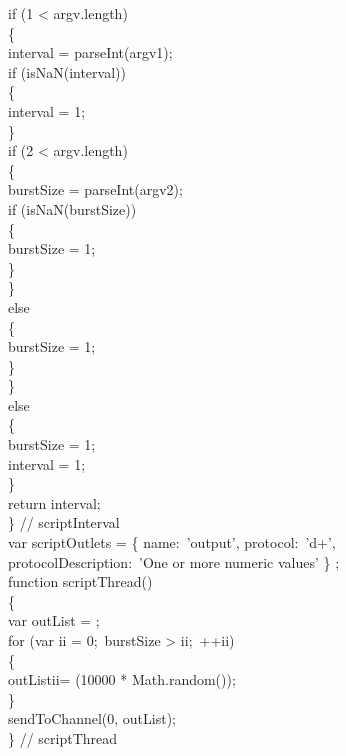\tS{}if (1 < argv.length)\\
\tS\{\\
\tS\tS{}interval = parseInt(argv\openSq{}1\closeSq);\\
\tS\tS{}if (isNaN(interval))\\
\tS\tS\{\\
\tS\tS\tS{}interval = 1;\\
\tS\tS\}\\
\tS\tS{}if (2 < argv.length)\\
\tS\tS\{\\
\tS\tS\tS{}burstSize = parseInt(argv\openSq{}2\closeSq);\\
\tS\tS\tS{}if (isNaN(burstSize))\\
\tS\tS\tS\{\\
\tS\tS\tS\tS{}burstSize = 1;\\
\tS\tS\tS\}\\
\tS\tS\}\\
\tS\tS{}else\\
\tS\tS\{\\
\tS\tS\tS{}burstSize = 1;\\
\tS\tS\}\\
\tS\}\\
\tS{}else\\
\tS\{\\
\tS\tS{}burstSize = 1;\\
\tS\tS{}interval = 1;\\
\tS\}\\
\tS{}return interval;\\
\} // scriptInterval\\

var scriptOutlets = \openSq{} \{ name:\ 'output', protocol:\ 'd+',\\
\tS\tS\tS\tS\tS\tS\tS\tS\tS\tS{}protocolDescription:\ 'One or more numeric values' \}
\closeSq;\\
\newpage
function scriptThread()\\
\{\\
\tS{}var outList = \openSq{}\closeSq;\\
    
\tS{}for (var ii = 0;\ burstSize > ii;\ ++ii)\\
\tS\{\\
\tS\tS{}outList\openSq{}ii\closeSq = (10000 * Math.random());\\
\tS\}\\
\tS{}sendToChannel(0, outList);\\
\} // scriptThread
\codeEnd{}
\secondaryEnd{}
\appendixEnd{}
